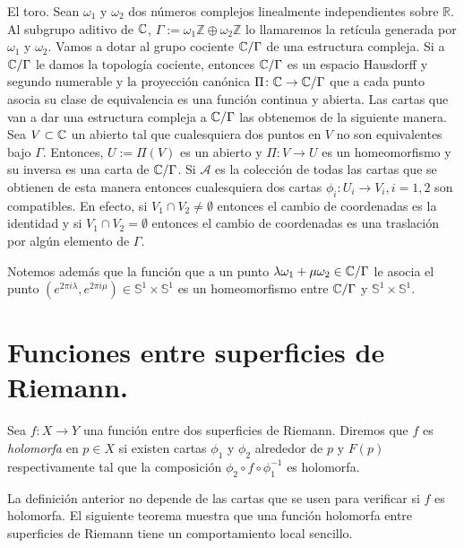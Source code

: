 \begin{Ejemplo}
El toro. Sean $\omega_{1}$ y $\omega_{2}$ dos números complejos linealmente independientes sobre $\mathbb{R}$. Al subgrupo aditivo de $\mathbb{C}$, $\Gamma:=\omega_{1}\mathbb{Z}\oplus\omega_{2}\mathbb{Z}$ lo llamaremos la retícula generada por $\omega_{1}$ y $\omega_{2}$. Vamos a dotar al grupo cociente $\mathbb{C}/\Gamma$ de una estructura compleja. Si a $\mathbb{C}/\Gamma$ le damos la topología cociente, entonces $\mathbb{C}/\Gamma$ es un espacio Hausdorff y segundo numerable y la proyección canónica $\Pi\colon\mathbb{C}\rightarrow\mathbb{C}/\Gamma$ que a cada punto asocia su clase de equivalencia es una función continua y abierta. Las cartas que van a dar una estructura compleja a $\mathbb{C}/\Gamma$ las obtenemos de la siguiente manera. Sea $V\subset\mathbb{C}$ un abierto tal que cualesquiera dos puntos en $V$ no son equivalentes bajo $\Gamma$. Entonces, $U:=\Pi(V)$ es un abierto y $\Pi\colon V\rightarrow U$ es un homeomorfismo y su inversa es una carta de $\mathbb{C}/\Gamma$. Si $\mathcal{A}$ es la colección de todas las cartas que se obtienen de esta manera entonces cualesquiera dos cartas $\phi_{i}\colon U_{i}\rightarrow V_{i}, i=1,2$ son compatibles. En efecto, si $V_{1}\cap V_{2}\neq\emptyset$ entonces el cambio de coordenadas es la identidad y si $V_{1}\cap V_{2}=\emptyset$ entonces el cambio de coordenadas es una traslación por algún elemento de $\Gamma$.

Notemos además que la función que a un punto $\lambda\omega_{1}+\mu\omega_{2}\in\mathbb{C}/\Gamma$ le asocia el punto $(e^{2\pi i\lambda},e^{2\pi i\mu})\in\mathbb{S}^{1}\times\mathbb{S}^{1}$ es un homeomorfismo entre $\mathbb{C}/\Gamma$ y $\mathbb{S}^{1}\times\mathbb{S}^{1}$.
\end{Ejemplo}

\section{Funciones entre superficies de Riemann.}

\begin{defn}
Sea $f\colon X\rightarrow Y$ una función entre dos superficies de Riemann. Diremos que $f$ es \emph{holomorfa} en $p\in X$ si existen cartas $\phi_{1}$ y $\phi_{2}$ alrededor de $p$ y $F(p)$ respectivamente tal que la composición $\phi_{2}\circ f\circ\phi^{-1}_{1}$ es holomorfa.
\end{defn}

La definición anterior no depende de las cartas que se usen para verificar si $f$ es holomorfa. El siguiente teorema muestra que una función holomorfa entre superficies de Riemann tiene un comportamiento local sencillo.

